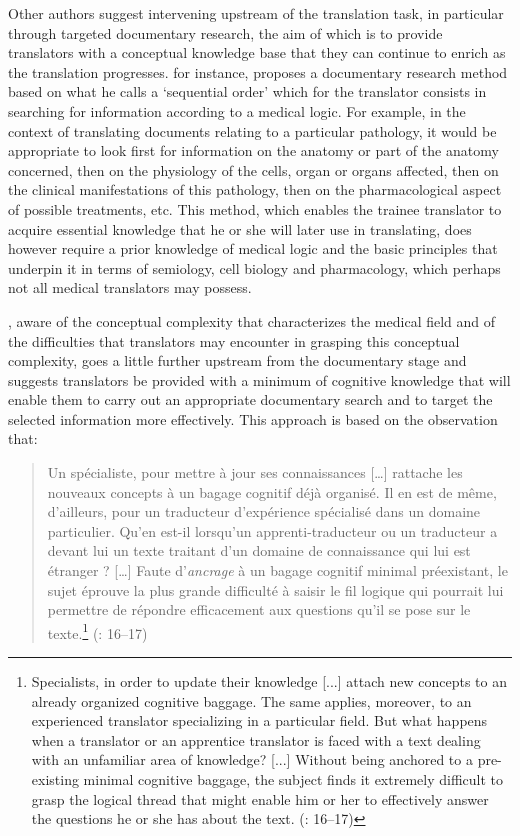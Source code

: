 \documentclass[output=paper]{langscibook}
\begin{document}
Other authors suggest intervening upstream of the translation task, in particular through targeted documentary research, the aim of which is to provide translators with a conceptual knowledge base that they can continue to enrich as the translation progresses. \citet{Jammal1999} for instance, proposes a documentary research method based on what he calls a ‘sequential order’ which for the translator consists in searching for information according to a medical logic. For example, in the context of translating documents relating to a particular pathology, it would be appropriate to look first for information on the anatomy or part of the anatomy concerned, then on the physiology of the cells, organ or organs affected, then on the clinical manifestations of this pathology, then on the pharmacological aspect of possible treatments, etc. This method, which enables the trainee translator to acquire essential knowledge that he or she will later use in translating, does however require a prior knowledge of medical logic and the basic principles that underpin it in terms of semiology, cell biology and pharmacology, which perhaps not all medical translators may possess.

\citet{Vandaele2001}, aware of the conceptual complexity that characterizes the medical field and of the difficulties that translators may encounter in grasping this conceptual complexity, goes a little further upstream from the documentary stage and suggests translators be provided with a minimum of cognitive knowledge that will enable them to carry out an appropriate documentary search and to target the selected information more effectively. This approach is based on the observation that:

\begin{quote}
Un spécialiste, pour mettre à jour ses connaissances […] rattache les nouveaux concepts à un bagage cognitif déjà organisé. Il en est de même, d’ailleurs, pour un traducteur d’expérience spécialisé dans un domaine particulier. Qu’en est-il lorsqu’un apprenti-traducteur ou un traducteur a devant lui un texte traitant d’un domaine de connaissance qui lui est étranger ? […] Faute d’\textit{ancrage} à un bagage cognitif minimal préexistant, le sujet éprouve la plus grande difficulté à saisir le fil logique qui pourrait lui permettre de répondre efficacement aux questions qu’il se pose sur le texte.\footnote{Specialists, in order to update their knowledge [...] attach new concepts to an already organized cognitive baggage. The same applies, moreover, to an experienced translator specializing in a particular field. But what happens when a translator or an apprentice translator is faced with a text dealing with an unfamiliar area of knowledge? [...] Without being anchored to a pre-existing minimal cognitive baggage, the subject finds it extremely difficult to grasp the logical thread that might enable him or her to effectively answer the questions he or she has about the text. (\citealt{Vandaele2001}: 16–17)} (\citealt{Vandaele2001}: 16–17)
\end{quote}
\end{document}
